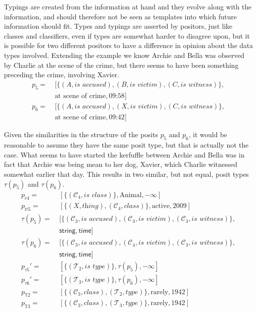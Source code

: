 \documentclass[sfsidenotes,nobib,twoside,symmetric]{tufte-handout}
\newcommand{\typeof}[1]{\tau(#1)}
\begin{document}
Typings are created from the information at hand and they evolve along with the information, and should therefore not be seen as templates into which future information should fit. Types and typings are asserted by positors, just like classes and classifiers, even if types are somewhat harder to disagree upon, but it is possible for two different positors to have a difference in opinion about the data types involved. Extending the example we know Archie and Bella was observed by Charlie at the scene of the crime, but there seems to have been something preceding the crime, involving Xavier.
\begin{align*}
p_{5} =\;& [\{(A, \textit{is accused}), (B, \textit{is victim}), (C, \textit{is witness})\}, \\
&\textrm{at scene of crime}, \textrm{09:58}] \\
p_{6} =\;& [\{(A, \textit{is accused}), (X, \textit{is victim}), (C, \textit{is witness})\}, \\
&\textrm{at scene of crime}, \textrm{09:42}] 
\end{align*}

Given the similarities in the structure of the posits $p_{5}$ and $p_{6}$, it would be reasonable to assume they have the same posit type, but that is actually not the case. What seems to have started the kerfuffle between Archie and Bella was in fact that Archie was being mean to her dog, Xavier, which Charlie witnessed somewhat earlier that day. This results in two similar, but not equal, posit types $\typeof{p_{5}}$ and $\typeof{p_{6}}$.
\begin{align*}
p_{c4} =\;& [\{(\mathcal{C}_4, \textit{is class})\}, \textrm{Animal}, -\infty] \\
p_{\mathbb{M}5} =\;& [\{(X, \textit{thing}), (\mathcal{C}_4, \textit{class})\}, \textrm{active}, \textrm{2009}] \\
\typeof{p_{5}} =\;& [\{(\mathcal{C}_3, \textit{is accused}), (\mathcal{C}_3, \textit{is victim}), (\mathcal{C}_3, \textit{is witness})\}, \\
&\mathsf{string}, \mathsf{time}] \\
\typeof{p_{6}} =\;& [\{(\mathcal{C}_3, \textit{is accused}), (\mathcal{C}_4, \textit{is victim}), (\mathcal{C}_3, \textit{is witness})\}, \\
&\mathsf{string}, \mathsf{time}] \\
p_{\tau5}' =\;& [\{(\mathcal{T}_2, \textit{is type})\}, \typeof{p_{5}}, -\infty] \\
p_{\tau6}' =\;& [\{(\mathcal{T}_3, \textit{is type})\}, \typeof{p_{6}}, -\infty] \\
p_{\mathbb{T}2} =\;& [\{(\mathcal{C}_3, \textit{class}), (\mathcal{T}_2, \textit{type})\}, \textrm{rarely}, \textrm{1942}] \\
p_{\mathbb{T}3} =\;& [\{(\mathcal{C}_3, \textit{class}), (\mathcal{T}_3, \textit{type})\}, \textrm{rarely}, \textrm{1942}] 
\end{align*}
\end{document}
